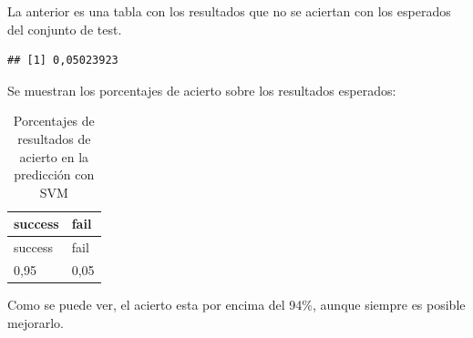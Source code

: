 \documentclass[]{article}
\newenvironment{Shaded}{\begin{snugshade}}{\end{snugshade}}
\newcommand{\KeywordTok}[1]{\textcolor[rgb]{0.13,0.29,0.53}{\textbf{#1}}}
\newcommand{\DataTypeTok}[1]{\textcolor[rgb]{0.13,0.29,0.53}{#1}}
\newcommand{\StringTok}[1]{\textcolor[rgb]{0.31,0.60,0.02}{#1}}
\newcommand{\OperatorTok}[1]{\textcolor[rgb]{0.81,0.36,0.00}{\textbf{#1}}}
\newcommand{\NormalTok}[1]{#1}
\begin{document}
La anterior es una tabla con los resultados que no se aciertan con los
esperados del conjunto de test.

\begin{Shaded}
\end{Shaded}

\begin{verbatim}
## [1] 0,05023923
\end{verbatim}

\begin{Shaded}
\end{Shaded}

Se muestran los porcentajes de acierto sobre los resultados esperados:

\begin{longtable}[]{@{}ll@{}}
\caption{Porcentajes de resultados de acierto en la predicción con
SVM}\tabularnewline
\toprule
success & fail\tabularnewline
\midrule
\endfirsthead
\toprule
success & fail\tabularnewline
\midrule
\endhead
0,95 & 0,05\tabularnewline
\bottomrule
\end{longtable}

Como se puede ver, el acierto esta por encima del 94\%, aunque siempre
es posible mejorarlo.
\end{document}
